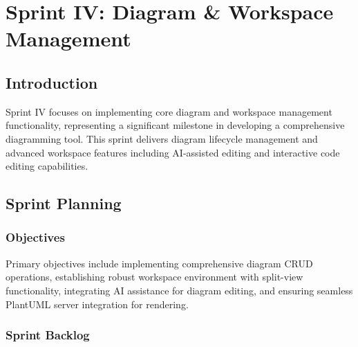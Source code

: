 \chapter[Sprint IV]{Sprint IV: Diagram \& Workspace Management}

\section{Introduction}
Sprint IV focuses on implementing core diagram and workspace management functionality, representing a significant milestone in developing a comprehensive diagramming tool. This sprint delivers diagram lifecycle management and advanced workspace features including AI-assisted editing and interactive code editing capabilities.

\section{Sprint Planning}

\subsection{Objectives}
Primary objectives include implementing comprehensive diagram CRUD operations, establishing robust workspace environment with split-view functionality, integrating AI assistance for diagram editing, and ensuring seamless PlantUML server integration for rendering.

\subsection{Sprint Backlog}


